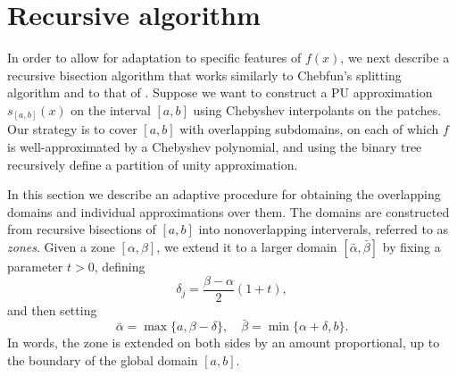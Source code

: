 \section{Recursive algorithm}
\label{PUM_recurse}
In order to allow for adaptation to specific features of $f(x)$, we next describe a recursive bisection algorithm that works similarly to Chebfun's splitting algorithm \cite{driscoll2014optimal} and to that of \cite{tobor2006reconstructing}. Suppose we want to construct a PU approximation $s_{[a,b]}(x)$ on the interval $[a,b]$ using Chebyshev interpolants on the patches. Our strategy is to cover $[a,b]$ with overlapping subdomains, on each of which $f$ is well-approximated by a Chebyshev polynomial, and using the binary tree recursively define a partition of unity approximation.

In this section we describe an adaptive procedure for obtaining the overlapping domains and individual approximations over them. The domains are constructed from recursive bisections of $[a,b]$ into nonoverlapping interverals, referred to as \emph{zones}. Given a zone $[\alpha,\beta]$, we extend it to a larger domain $[\bar{\alpha},\bar{\beta}]$ by fixing a parameter $t>0$, defining
\begin{equation}
  \label{eq:overlap1d}
  \delta_{j} =  \frac{\beta-\alpha}{2}(1+t),
\end{equation}
and then setting
\begin{equation}
  \bar{\alpha} = \max\{a,\beta-\delta\}, \quad \bar{\beta} = \min\{\alpha+\delta,b\}.
  \label{eq:zone_extend1d}
\end{equation}
In words, the zone is extended on both sides by an amount proportional, up to the boundary of the global domain $[a,b]$. 



